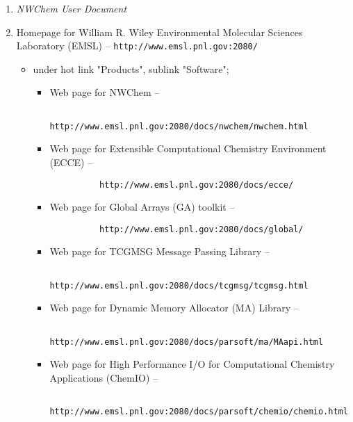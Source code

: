 \begin{enumerate}
\item {\em NWChem User Document}

\item Homepage for William R. Wiley Environmental Molecular Sciences Laboratory
      (EMSL) -- \verb+http://www.emsl.pnl.gov:2080/+

\begin{itemize}

\item under hot link "Products", sublink "Software";

\begin{itemize}
\item Web page for NWChem -- 
\begin{verbatim}
          http://www.emsl.pnl.gov:2080/docs/nwchem/nwchem.html
\end{verbatim}

\item Web page for Extensible Computational Chemistry Environment (ECCE) --
\begin{verbatim}
          http://www.emsl.pnl.gov:2080/docs/ecce/
\end{verbatim}

\item Web page for Global Arrays (GA) toolkit -- 
\begin{verbatim}
          http://www.emsl.pnl.gov:2080/docs/global/
\end{verbatim}

\item Web page for TCGMSG Message Passing Library --
\begin{verbatim}
          http://www.emsl.pnl.gov:2080/docs/tcgmsg/tcgmsg.html
\end{verbatim}

\item Web page for Dynamic Memory Allocator (MA) Library -- 
\begin{verbatim}
          http://www.emsl.pnl.gov:2080/docs/parsoft/ma/MAapi.html
\end{verbatim}

\item Web page for High Performance I/O for Computational Chemistry Applications (ChemIO) --
\begin{verbatim}
          http://www.emsl.pnl.gov:2080/docs/parsoft/chemio/chemio.html
\end{verbatim}
\end{itemize}
\end{itemize}

\end{enumerate}

